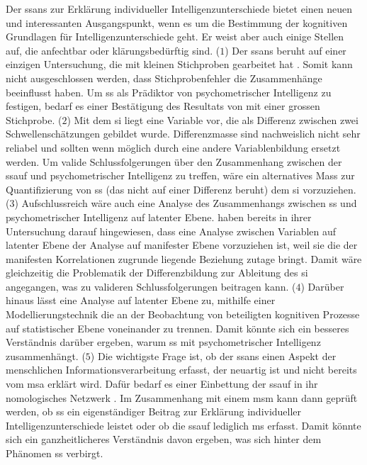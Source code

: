 \documentclass[11pt, twoside, a4paper]{book}		%
\begin{document}
Der \gls{ssans} zur Erklärung individueller Intelligenzunterschiede \citep{Melnick2013} bietet einen neuen und interessanten Ausgangspunkt, wenn es um die Bestimmung der kognitiven Grundlagen für Intelligenzunterschiede geht. Er weist aber auch einige Stellen auf, die anfechtbar oder klärungsbedürftig sind.
($1$) Der \gls{ssans} beruht auf einer einzigen Untersuchung, die mit kleinen Stichproben gearbeitet hat \citep[Studie 1: $N=12$ und Studie 2: $N=53$;][]{Melnick2013}. Somit kann nicht ausgeschlossen werden, dass Stichprobenfehler die Zusammenhänge beeinflusst haben. Um \gls{ss} als Prädiktor von psychometrischer Intelligenz zu festigen, bedarf es einer Bestätigung des Resultats von \citet{Melnick2013} mit einer grossen Stichprobe.
($2$) Mit dem \gls{si} liegt eine Variable vor, die als Differenz zwischen zwei Schwellenschätzungen gebildet wurde. Differenzmasse sind nachweislich nicht sehr reliabel \citep[][S. 145]{Murphy2005} und sollten wenn möglich durch eine andere Variablenbildung ersetzt werden. Um valide Schlussfolgerungen über den Zusammenhang zwischen der \gls{ssauf} und psychometrischer Intelligenz zu treffen, wäre ein alternatives Mass zur Quantifizierung von \gls{ss} (das nicht auf einer Differenz beruht) dem \gls{si} vorzuziehen.
($3$) Aufschlussreich wäre auch eine Analyse des Zusammenhangs zwischen \gls{ss} und psychometrischer Intelligenz auf latenter Ebene. \citet{Melnick2013} haben bereits in ihrer Untersuchung darauf hingewiesen, dass eine Analyse zwischen Variablen auf latenter Ebene der Analyse auf manifester Ebene vorzuziehen ist, weil sie die der manifesten Korrelationen zugrunde liegende Beziehung zutage bringt. Damit wäre gleichzeitig die Problematik der Differenzbildung zur Ableitung des \gls{si} angegangen, was zu valideren Schlussfolgerungen beitragen kann.
($4$) Darüber hinaus lässt eine Analyse auf latenter Ebene zu, mithilfe einer Modellierungstechnik \citep[\gls{flm}e;][]{Schweizer2006a, Schweizer2006b} die an der Beobachtung von \citeauthor{Melnick2013} beteiligten kognitiven Prozesse auf statistischer Ebene voneinander zu trennen. Damit könnte sich ein besseres Verständnis darüber ergeben, warum \gls{ss} mit psychometrischer Intelligenz zusammenhängt.
($5$) Die wichtigste Frage ist, ob der \gls{ssans} einen Aspekt der menschlichen Informationsverarbeitung erfasst, der neuartig ist und nicht bereits vom \gls{msa} erklärt wird. Dafür bedarf es einer Einbettung der \gls{ssauf} in ihr nomologisches Netzwerk \citep{Cronbach1955}. Im Zusammenhang mit einem \gls{msm} kann dann geprüft werden, ob \gls{ss} ein eigenständiger Beitrag zur Erklärung individueller Intelligenzunterschiede leistet oder ob die \gls{ssauf} lediglich \gls{ms} erfasst. Damit könnte sich ein ganzheitlicheres Verständnis davon ergeben, was sich hinter dem Phänomen \gls{ss} verbirgt.
\end{document}

